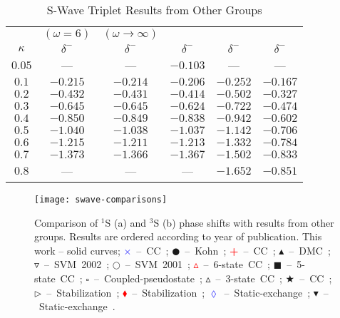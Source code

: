 \documentclass[Dissertation.tex]{subfiles}
\begin{document}
\begin{table}[H]
\centering
\begin{tabular}{c c c c c c}
\toprule
 & $(\omega = 6)$ & $(\omega \rightarrow \infty)$ &  &  &   \\
$\kappa$ & $\delta^-$ \cite{VanReeth2003} & $\delta^-$ \cite{VanReeth2003} & $\delta^-$ \cite{Blackwood2002} & $\delta^-$ \cite{Ray1997} & $\delta^-$ \cite{Adhikari1999} \\
\midrule
$0.05$ & --- & --- & $-0.103$ & --- & --- \\
$0.1$ & $-0.215$ & $-0.214$ & $-0.206$ & $-0.252$ & $-0.167$ \\
$0.2$ & $-0.432$ & $-0.431$ & $-0.414$ & $-0.502$ & $-0.327$ \\
$0.3$ & $-0.645$ & $-0.645$ & $-0.624$ & $-0.722$ & $-0.474$ \\
$0.4$ & $-0.850$ & $-0.849$ & $-0.838$ & $-0.942$ & $-0.602$ \\
$0.5$ & $-1.040$ & $-1.038$ & $-1.037$ & $-1.142$ & $-0.706$ \\
$0.6$ & $-1.215$ & $-1.211$ & $-1.213$ & $-1.332$ & $-0.784$ \\
$0.7$ & $-1.373$ & $-1.366$ & $-1.367$ & $-1.502$ & $-0.833$ \\
$0.8$ &    --- &    --- &    --- & $-1.652$ & $-0.851$ \\
\bottomrule
\end{tabular}
\caption{S-Wave Triplet Results from Other Groups}
\label{tab:SWaveTripletOther}
\end{table}


\begin{figure}[H]
	\centering
	\texttt{[image: swave-comparisons]}
	\caption[Comparison of S-wave phase shifts]{Comparison of $^1$S (a) and $^3$S (b) phase shifts with results from other groups. Results are ordered according to year of publication. This work -- solid curves; \mbox{\textcolor{blue}{$\times$} -- CC \cite{Walters2004};} \mbox{$\CIRCLE$ -- Kohn \cite{VanReeth2003};} \mbox{\textcolor{red}{\textbf{+}} -- CC \cite{Blackwood2002};} \mbox{$\blacktriangle$ -- DMC \cite{Chiesa2002};} \mbox{$\triangledown$ -- SVM 2002 \cite{Ivanov2002};} \mbox{$\Circle$ -- SVM 2001 \cite{Ivanov2001};} \mbox{\textcolor{red}{$\vartriangle$} -- 6-state CC \cite{Sinha2000};} \mbox{$\blacksquare$ -- 5-state CC \cite{Adhikari1999};} \mbox{$\square$ -- Coupled-pseudostate \cite{Campbell1998};} \mbox{$\vartriangle$ -- 3-state CC \cite{Sinha1997};} \mbox{\textcolor[RGB]{0,127,0}{$\bigstar$} -- CC \cite{Ray1997};} \mbox{$\triangleright$ -- Stabilization \cite{Drachman1976};} \mbox{\textcolor{red}{$\blacklozenge$} -- Stabilization \cite{Drachman1975};} \mbox{\textcolor{blue}{$\lozenge$} -- Static-exchange \cite{Hara1975};} \mbox{$\blacktriangledown$ -- Static-exchange \cite{Fraser1961}.}}
	\label{fig:SWaveComparisons}
\end{figure}
\end{document}
